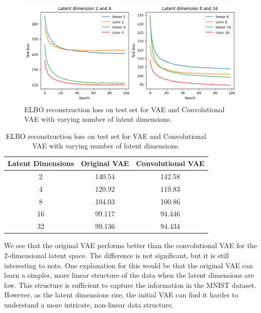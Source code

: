 \begin{figure}[h]
\centering
\includegraphics[width=\textwidth]{images/test_loss.png}
\setlength{\belowcaptionskip}{-10pt}
\caption{ELBO reconstruction loss on test set for VAE and Convolutional VAE with varying number of latent dimensions.}
\label{fig:vaeloss}
\end{figure}

\begin{table}
\centering
\begin{tabular}{|c|c|c|}
\hline
\multicolumn{1}{|c|}{\textbf{Latent Dimensions}} & \multicolumn{1}{c|}{\textbf{Original VAE}} & \multicolumn{1}{c|}{\textbf{Convolutional VAE}} \\ \hline
\multicolumn{1}{|c|}{2} & \multicolumn{1}{c|}{140.54} & \multicolumn{1}{c|}{142.58}  \\ \hline
\multicolumn{1}{|c|}{4} & \multicolumn{1}{c|}{120.92} & \multicolumn{1}{c|}{119.83}  \\ \hline
\multicolumn{1}{|c|}{8} & \multicolumn{1}{c|}{104.03} & \multicolumn{1}{c|}{100.86}  \\ \hline
\multicolumn{1}{|c|}{16} & \multicolumn{1}{c|}{99.117} & \multicolumn{1}{c|}{94.446}  \\ \hline
\multicolumn{1}{|c|}{32} & \multicolumn{1}{c|}{99.136} & \multicolumn{1}{c|}{94.434}  \\ \hline
\end{tabular}
\vspace*{0.5cm}
\setlength{\belowcaptionskip}{-10pt}
\caption{ELBO reconstruction loss on test set for VAE and Convolutional VAE with varying number of latent dimensions.}
\label{tab:vaeloss}
\end{table}

We see that the original VAE performs better than the convolutional VAE for the 2-dimensional latent space. The difference is not significant, but it is still interesting to note. One explanation for this would be that the original VAE can learn a simpler, more linear structure of the data when the latent dimensions are low. This structure is sufficient to capture the information in the MNIST dataset. However, as the latent dimensions rise, the initial VAE can find it harder to understand a more intricate, non-linear data structure.

